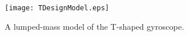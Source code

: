 \documentclass[twoside]{article}
\begin{document}
\begin{figure}[!h!] %
	\begin{center}
		\texttt{[image: TDesignModel.eps]}
		\caption{A lumped-mass model of the T-shaped gyroscope.}
		\label{fig:TDesignModel}
	\end{center}
\end{figure}
%


%
%
\end{document}
